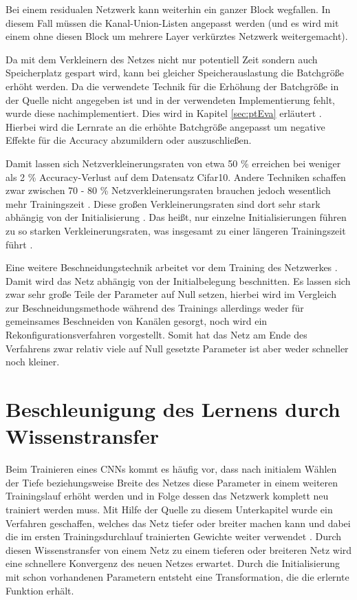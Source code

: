 Bei einem residualen Netzwerk kann weiterhin ein ganzer Block wegfallen. In diesem Fall müssen die Kanal-Union-Listen angepasst werden (und es wird mit einem ohne diesen Block um mehrere Layer verkürztes Netzwerk weitergemacht).


Da mit dem Verkleinern des Netzes nicht nur potentiell Zeit sondern auch Speicherplatz gespart wird, kann bei gleicher Speicherauslastung die Batchgröße erhöht werden. Da die verwendete Technik für die Erhöhung der Batchgröße in der Quelle nicht angegeben ist und in der verwendeten Implementierung fehlt, wurde diese nachimplementiert. Dies wird in Kapitel \ref{sec:ptEva} erläutert \cite{ptImpl}. Hierbei wird die Lernrate an die erhöhte Batchgröße angepasst um negative Effekte für die Accuracy abzumildern oder auszuschließen. 

Damit lassen sich Netzverkleinerungsraten von etwa 50 \% erreichen bei weniger als 2 \% Accuracy-Verlust auf dem Datensatz Cifar10. Andere Techniken schaffen zwar zwischen 70 - 80 \% Netzverkleinerungsraten brauchen jedoch wesentlich mehr Trainingszeit \cite{lottery}. Diese großen Verkleinerungsraten sind dort sehr stark abhängig von der Initialisierung \cite{lottery}. Das heißt, nur einzelne Initialisierungen führen zu so starken Verkleinerungsraten, was insgesamt zu einer längeren Trainingszeit führt \cite{lottery}. 


Eine weitere Beschneidungstechnik arbeitet vor dem Training des Netzwerkes \cite{snyc}. Damit wird das Netz abhängig von der Initialbelegung beschnitten. Es lassen sich zwar sehr große Teile der Parameter auf Null setzen, hierbei wird im Vergleich zur Beschneidungsmethode während des Trainings allerdings weder für gemeinsames Beschneiden von Kanälen gesorgt, noch wird ein Rekonfigurationsverfahren vorgestellt. Somit hat das Netz am Ende des Verfahrens zwar relativ viele auf Null gesetzte Parameter ist aber weder schneller noch kleiner.


\section{Beschleunigung des Lernens durch Wissenstransfer}
\label{sec:net2net}
Beim Trainieren eines CNNs kommt es häufig vor, dass nach initialem Wählen der Tiefe beziehungsweise Breite des Netzes diese Parameter in einem weiteren Trainingslauf erhöht werden und in Folge dessen das Netzwerk komplett neu trainiert werden muss. Mit Hilfe der Quelle zu diesem Unterkapitel wurde ein Verfahren geschaffen, welches das Netz tiefer oder breiter machen kann und dabei die im ersten Trainingsdurchlauf trainierten Gewichte weiter verwendet \cite{net2net}. Durch diesen Wissenstransfer von einem Netz zu einem tieferen oder breiteren Netz wird eine schnellere Konvergenz des neuen Netzes erwartet. Durch die Initialisierung mit schon vorhandenen Parametern entsteht eine Transformation, die die erlernte Funktion erhält.

